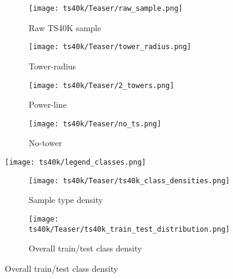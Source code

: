 \begin{figure}[ht]
      \centering
      \begin{minipage}[t]{0.51\textwidth} %
            \begin{subfigure}[b]{\textwidth}
                  \texttt{[image: ts40k/Teaser/raw\_sample.png]}
                  \caption{Raw TS40K sample}
                  \label{fig:teaser-raw-sample}
            \end{subfigure}
            \vfill
            \begin{subfigure}[b]{0.33\textwidth}
                  \texttt{[image: ts40k/Teaser/tower\_radius.png]}
                  \caption{Tower-radius}
                  \label{fig:teaser-tower-radius}
            \end{subfigure}
            \hfill
            \begin{subfigure}[b]{0.33\textwidth}
                  \texttt{[image: ts40k/Teaser/2\_towers.png]}
                  \caption{Power-line}
                  \label{fig:teaser-power-line}
            \end{subfigure}
            \hfill
            \begin{subfigure}[b]{0.30\textwidth}
                  \texttt{[image: ts40k/Teaser/no\_ts.png]}
                  \caption{No-tower}
                  \label{fig:teaser-no-ts}
            \end{subfigure}
            \vfill
            \texttt{[image: ts40k/legend\_classes.png]}
      \end{minipage}
      \quad
      \begin{minipage}[t]{0.45\textwidth} %
            \begin{subfigure}[b]{1.0\textwidth}
                  \texttt{[image: ts40k/Teaser/ts40k\_class\_densities.png]}
                  \caption{Sample type density}
                  \label{fig:density1}
            \end{subfigure}
            \hfill
            \begin{subfigure}[b]{1.0\textwidth}
                  \texttt{[image: ts40k/Teaser/ts40k\_train\_test\_distribution.png]}
                  \caption{Overall train/test class density}
                  \label{fig:density2}
            \end{subfigure}
      \end{minipage}


\end{figure}
